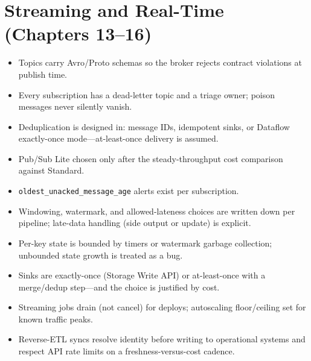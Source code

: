 \section{Streaming and Real-Time (Chapters 13--16)}
\begin{itemize}
    \item[$\square$] Topics carry Avro/Proto schemas so the broker rejects contract violations at
    publish time.
    \item[$\square$] Every subscription has a dead-letter topic and a triage owner; poison
    messages never silently vanish.
    \item[$\square$] Deduplication is designed in: message IDs, idempotent sinks, or Dataflow
    exactly-once mode---at-least-once delivery is assumed.
    \item[$\square$] Pub/Sub Lite chosen only after the steady-throughput cost comparison against
    Standard.
    \item[$\square$] \texttt{oldest\_unacked\_message\_age} alerts exist per subscription.
    \item[$\square$] Windowing, watermark, and allowed-lateness choices are written down per
    pipeline; late-data handling (side output or update) is explicit.
    \item[$\square$] Per-key state is bounded by timers or watermark garbage collection; unbounded
    state growth is treated as a bug.
    \item[$\square$] Sinks are exactly-once (Storage Write API) or at-least-once with a merge/dedup
    step---and the choice is justified by cost.
    \item[$\square$] Streaming jobs drain (not cancel) for deploys; autoscaling floor/ceiling set
    for known traffic peaks.
    \item[$\square$] Reverse-ETL syncs resolve identity before writing to operational systems and
    respect API rate limits on a freshness-versus-cost cadence.
\end{itemize}

